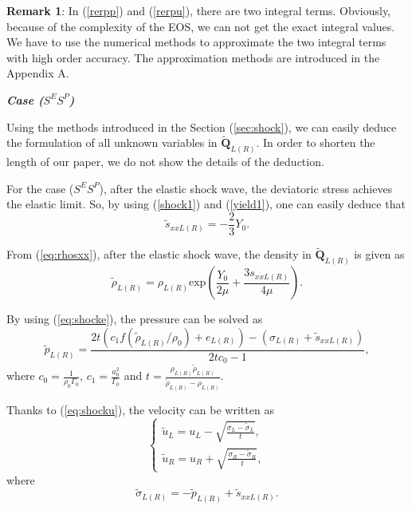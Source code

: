 \documentclass[review]{elsarticle}
\numberwithin{equation}{section}
\numberwithin{table}{section}
\begin{document}
\textbf{Remark 1}:  In (\ref{rerpp}) and (\ref{rerpu}), there are two integral terms. Obviously, because of the complexity of the EOS, we can not get the exact integral values. We have to use the numerical methods to approximate the two integral terms with high order accuracy. The approximation methods are introduced in the Appendix A.


\emph{\textbf{Case ($S^{E}S^{P}$)}}

Using the methods introduced in  the Section (\ref{sec:shock}), we can easily deduce the formulation of all unknown variables in $\tilde{\mathbf{Q}}_{L(R)}$. In order to shorten the length of our paper, we do not show the details of the deduction.

For the case ($S^{E}S^{P}$), after the elastic shock wave, the deviatoric stress achieves the elastic limit. So, by using (\ref{shock1}) and (\ref{yield1}), one can easily deduce that
\begin{equation*}
\tilde{s}_{xxL(R)} = -\frac{2}{3}Y_0.
\end{equation*}

From (\ref{eq:rhosxx}), after the elastic shock wave, the density in $\tilde{\mathbf{Q}}_{L(R)}$ is given as
\begin{equation*}
\tilde{\rho}_{L(R)} = \rho_{L(R)} \text{exp}\left(\frac{Y_0}{2\mu}+\frac{3 s_{xxL(R)}}{4\mu}\right).
\end{equation*}


By using (\ref{eq:shocke}), the pressure can be solved as
\begin{equation}
  \tilde{p}_{L(R)}=
  \frac{2t(c_1f(\tilde{\rho}_{L(R)}/\rho_0)+e_{L(R)})-(\sigma_{L(R)}+\tilde{s}_{xxL(R)})}{2tc_0-1},
\end{equation}
where $c_0 = \frac{1}{\rho_0\Gamma_0}$, $c_1 = \frac{a_0^2}{\Gamma_0}$ and $ t=\frac{\rho_{L(R)} \tilde{\rho}_{L(R)}}{\tilde{\rho}_{L(R)}-\rho_{L(R)}}$.

Thanks to (\ref{eq:shocku}), the velocity can be written as
\begin{equation}
 \left\{ \begin{array}{ll}
   \tilde{u}_{L}= u_L -\sqrt{\frac{\sigma_L-\tilde{\sigma}_{L}}{t}},\\
	   \tilde{u}_{R} =   u_R +\sqrt{\frac{\sigma_R-\tilde{\sigma}_{R}}{t}},
   \end{array}
 \right.
 \end{equation}
 where
 \begin{equation}
   \tilde{\sigma}_{L(R)} = -\tilde{p}_{L(R)} + \tilde{s}_{xxL(R)}.
 \end{equation}
\end{document}
